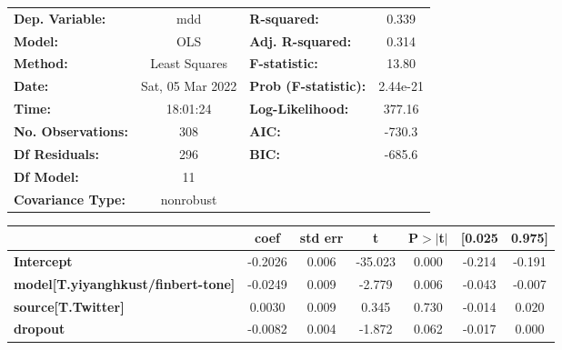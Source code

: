 \begin{center}
\begin{tabular}{lclc}
\toprule
\textbf{Dep. Variable:}                    &       mdd        & \textbf{  R-squared:         } &     0.339   \\
\textbf{Model:}                            &       OLS        & \textbf{  Adj. R-squared:    } &     0.314   \\
\textbf{Method:}                           &  Least Squares   & \textbf{  F-statistic:       } &     13.80   \\
\textbf{Date:}                             & Sat, 05 Mar 2022 & \textbf{  Prob (F-statistic):} &  2.44e-21   \\
\textbf{Time:}                             &     18:01:24     & \textbf{  Log-Likelihood:    } &    377.16   \\
\textbf{No. Observations:}                 &         308      & \textbf{  AIC:               } &    -730.3   \\
\textbf{Df Residuals:}                     &         296      & \textbf{  BIC:               } &    -685.6   \\
\textbf{Df Model:}                         &          11      & \textbf{                     } &             \\
\textbf{Covariance Type:}                  &    nonrobust     & \textbf{                     } &             \\
\bottomrule
\end{tabular}
\begin{tabular}{lcccccc}
                                           & \textbf{coef} & \textbf{std err} & \textbf{t} & \textbf{P$> |$t$|$} & \textbf{[0.025} & \textbf{0.975]}  \\
\midrule
\textbf{Intercept}                         &      -0.2026  &        0.006     &   -35.023  &         0.000        &       -0.214    &       -0.191     \\
\textbf{model[T.yiyanghkust/finbert-tone]} &      -0.0249  &        0.009     &    -2.779  &         0.006        &       -0.043    &       -0.007     \\
\textbf{source[T.Twitter]}                 &       0.0030  &        0.009     &     0.345  &         0.730        &       -0.014    &        0.020     \\
\textbf{dropout}                           &      -0.0082  &        0.004     &    -1.872  &         0.062        &       -0.017    &        0.000     \\

\end{tabular}
\end{center}
